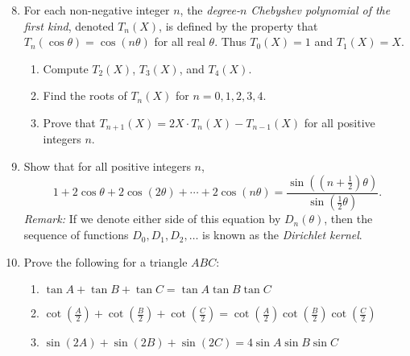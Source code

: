 \begin{enumerate}\setcounter{enumi}{7}
\item For each non-negative integer $n$, the \emph{degree-$n$ Chebyshev polynomial of the first kind}, denoted $T_n(X)$, is defined by the property that $T_n(\cos\theta) = \cos(n\theta)$ for all real $\theta$. Thus $T_0(X) = 1$ and $T_1(X) = X$.
\begin{enumerate}
\item Compute $T_2(X)$, $T_3(X)$, and $T_4(X)$.
\item Find the roots of $T_n(X)$ for $n = 0, 1, 2, 3, 4$.
\item Prove that $T_{n + 1}(X) = 2X\cdot T_n(X) - T_{n - 1}(X)$ for all positive integers $n$.
\end{enumerate}
\item Show that for all positive integers $n$,
\begin{equation*}
1 + 2\cos\theta + 2\cos(2\theta) + \cdots + 2\cos(n\theta) = \frac{\sin((n + \frac{1}{2})\theta)}{\sin(\frac{1}{2}\theta)}.
\end{equation*}
\emph{Remark:} If we denote either side of this equation by $D_n(\theta)$, then the sequence of functions $D_0, D_1, D_2, \ldots$ is known as the \emph{Dirichlet kernel}.
\item Prove the following for a triangle $ABC$:
\begin{enumerate}
\item $\tan A + \tan B + \tan C = \tan A\tan B\tan C$
\item $\cot(\frac{A}{2}) + \cot(\frac{B}{2}) + \cot(\frac{C}{2}) = \cot(\frac{A}{2})\cot(\frac{B}{2})\cot(\frac{C}{2})$
\item $\sin(2A) + \sin(2B) + \sin(2C) = 4\sin A\sin B\sin C$
\end{enumerate}
\end{enumerate}